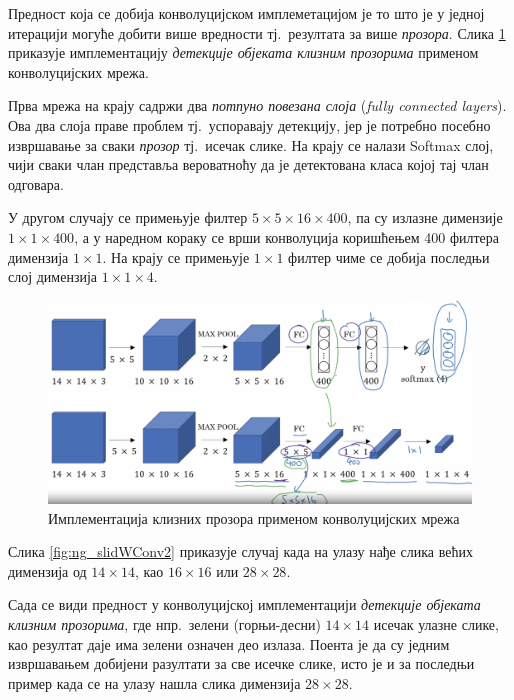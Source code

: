 \documentclass[12pt, а4paper]{article}
\begin{document}
Предност која се добија конволуцијском имплеметацијом је то што
је у једној итерацији могуће добити више вредности тј.\ резултата
за више \textit{прозора}. Слика \ref{fig:ng_slidWConv1} приказује
имплементацију \textit{детекције објеката клизним прозорима} применом
конволуцијских мрежа.

Прва мрежа на крају
садржи два \textit{потпуно повезана слоја} (\textit{fully connected layers}).
Ова два слоја праве проблем тј.\ успоравају детекцију, јер је
потребно посебно извршавање за сваки \textit{прозор} тј.\ исечак слике. На крају се
налази Softmax слој, чији сваки члан представља вероватноћу да је детектована класа
којој тај члан одговара.

У другом случају се примењује филтер \mbox{$5 \times 5 \times 16 \times 400$}, па
су излазне димензије \mbox{$1 \times 1 \times 400$}, а у наредном кораку се врши конволуција
коришћењем 400 филтера димензија $1 \times 1$. На крају се примењује $1 \times 1$ филтер чиме се добија
последњи слој димензија \mbox{$1 \times 1 \times 4$}.

\begin{figure}[H]
  \centering
      \includegraphics[scale=0.3]{slike/ngSlidWConv1.png}
  \caption{Имплементација клизних прозора применом конволуцијских мрежа}
  \label{fig:ng_slidWConv1}
\end{figure}

Слика \ref{fig:ng_slidWConv2} приказује случај када на улазу нађе слика
већих димензија од $14 \times 14$, као 	$16 \times 16$ или $28 \times 28$.

Сада се види предност у конволуцијској имплементацији
\textit{детекције објеката клизним прозорима}, где нпр.\ зелени
(\mbox{горњи-десни})
$14 \times 14$ исечак улазне слике, као резултат даје има зелени означен
део излаза. Поента је да су једним извршавањем добијени разултати
за све исечке слике, исто је и за последњи пример када се на улазу нашла
слика димензија $28 \times 28$.
\end{document}
